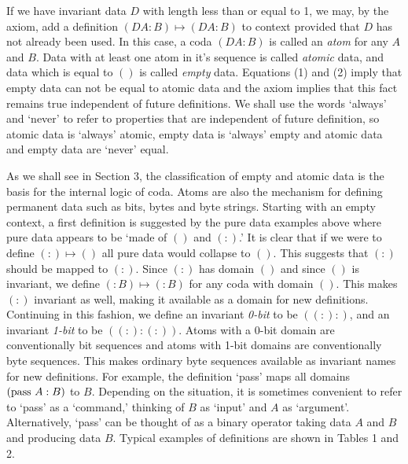 \documentclass[11pt]{article}
\begin{document}
      If we have invariant data $D$ with length less than or equal to 1, we may, by the axiom,
add a definition $(D A:B)\mapsto(D A:B)$ to context provided
that $D$ has not already been used.  In this case, a coda $(D A:B)$ is called an {\it atom} for any $A$ and $B$.
Data with at least one atom in it's sequence is called {\it atomic} data, and data which is equal to $()$ is called {\it empty} data.
Equations (1) and (2) imply that empty data can not be equal to atomic data and the axiom implies that this fact remains
true independent of future definitions.  We shall use the words `always' and `never' to refer to properties that are independent of
future definition, so atomic data is `always' atomic, empty data is `always' empty and atomic data and empty data are `never' equal.

    As we shall see in Section 3, the classification of empty and atomic data is the basis for the internal logic of coda.
Atoms are also the mechanism for defining permanent data such as bits, bytes and byte strings.
Starting with an empty context, a first definition is suggested by the pure data examples above where pure data
appears to be `made of $()$ and $(:)$.'
It is clear that if we were to define $(:)\mapsto()$ all pure data would collapse to $()$.  This suggests that $(:)$ should be
mapped to $(:)$.  Since $(:)$ has domain $()$ and since $()$ is invariant, we define $(:B)\mapsto(:B)$ for any coda with
domain $()$.  This makes $(:)$ invariant as well, making it available as a domain for new definitions.
Continuing in this fashion, we define an invariant {\it 0-bit} to be $((:):)$, and an invariant {\it 1-bit} to be $((:):(:))$.
Atoms with a 0-bit domain are conventionally bit sequences and atoms with 1-bit domains are conventionally byte sequences.
This makes ordinary byte sequences available as invariant names for new definitions.  For example, the definition `pass' maps
all domains $({\rm pass}\ A:B)$ to $B$.  Depending on the situation,
it is sometimes convenient to refer to `pass' as a `command,' thinking of $B$ as
`input' and $A$ as `argument'.  Alternatively, `pass' can be thought of as a binary operator taking data $A$ and $B$ and producing data $B$.
Typical examples of definitions are shown in Tables 1 and 2.
\end{document}
